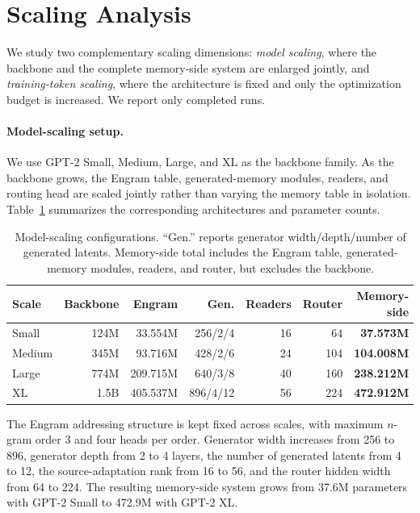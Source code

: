 \section{Scaling Analysis}
\label{app:scaling}

We study two complementary scaling dimensions:
\emph{model scaling}, where the backbone and the complete memory-side system
are enlarged jointly, and \emph{training-token scaling}, where the architecture
is fixed and only the optimization budget is increased.
We report only completed runs.

\paragraph{Model-scaling setup.}
We use GPT-2 Small, Medium, Large, and XL as the backbone family.
As the backbone grows, the Engram table, generated-memory modules, readers,
and routing head are scaled jointly rather than varying the memory table in
isolation. Table~\ref{tab:scaling-config} summarizes the corresponding
architectures and parameter counts.

\begin{table}[t]
\centering
\caption{
Model-scaling configurations. ``Gen.'' reports generator
width/depth/number of generated latents. Memory-side total includes the Engram
table, generated-memory modules, readers, and router, but excludes the backbone.
}
\label{tab:scaling-config}
\small
\setlength{\tabcolsep}{4.5pt}
\renewcommand{\arraystretch}{1.08}
\begin{tabular}{@{}lrrrrrr@{}}
\toprule
\textbf{Scale}
& \textbf{Backbone}
& \textbf{Engram}
& \textbf{Gen.}
& \textbf{Readers}
& \textbf{Router}
& \textbf{Memory-side} \\
\midrule
Small
& 124M
& 33.554M
& 256/2/4
& 16
& 64
& \textbf{37.573M} \\

Medium
& 345M
& 93.716M
& 428/2/6
& 24
& 104
& \textbf{104.008M} \\

Large
& 774M
& 209.715M
& 640/3/8
& 40
& 160
& \textbf{238.212M} \\

XL
& 1.5B
& 405.537M
& 896/4/12
& 56
& 224
& \textbf{472.912M} \\
\bottomrule
\end{tabular}
\end{table}

The Engram addressing structure is kept fixed across scales, with maximum
$n$-gram order 3 and four heads per order. Generator width increases from
256 to 896, generator depth from 2 to 4 layers, the number of generated
latents from 4 to 12, the source-adaptation rank from 16 to 56, and the router
hidden width from 64 to 224. The resulting memory-side system grows from
37.6M parameters with GPT-2 Small to 472.9M with GPT-2 XL.

